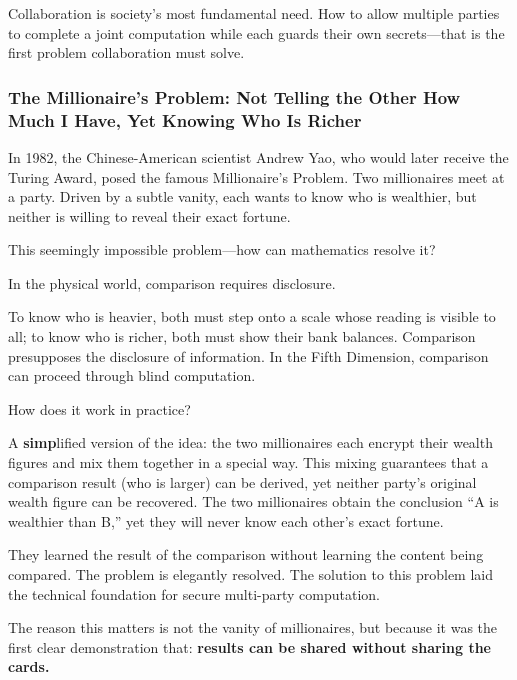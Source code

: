 Collaboration is society's most fundamental need. How to allow multiple parties to complete a joint computation while each guards their own secrets---that is the first problem collaboration must solve.

{}
\subsubsection{The Millionaire's Problem: Not Telling the Other How Much I Have, Yet Knowing Who Is Richer}

In 1982, the Chinese-American scientist Andrew Yao, who would later receive the Turing Award, posed the famous Millionaire's Problem.
Two millionaires meet at a party.
Driven by a subtle vanity, each wants to know who is wealthier,
but neither is willing to reveal their exact fortune.

\vspace{1em}

This seemingly impossible problem---how can mathematics resolve it?

In the physical world, comparison requires disclosure.

To know who is heavier, both must step onto a scale whose reading is visible to all; to know who is richer, both must show their bank balances. Comparison presupposes the disclosure of information. In the Fifth Dimension, comparison can proceed through blind computation.

How does it work in practice?

A \textbf{simp}lified version of the idea: the two millionaires each encrypt their wealth figures and mix them together in a special way. This mixing guarantees that a comparison result (who is larger) can be derived, yet neither party's original wealth figure can be recovered.
The two millionaires obtain the conclusion ``A is wealthier than B,'' yet they will never know each other's exact fortune.

\vspace{1em}

They learned the result of the comparison without learning the content being compared.
The problem is elegantly resolved. The solution to this problem laid the technical foundation for secure multi-party computation.

The reason this matters is not the vanity of millionaires, but because it was the first clear demonstration that: \textbf{results can be shared without sharing the cards.}

